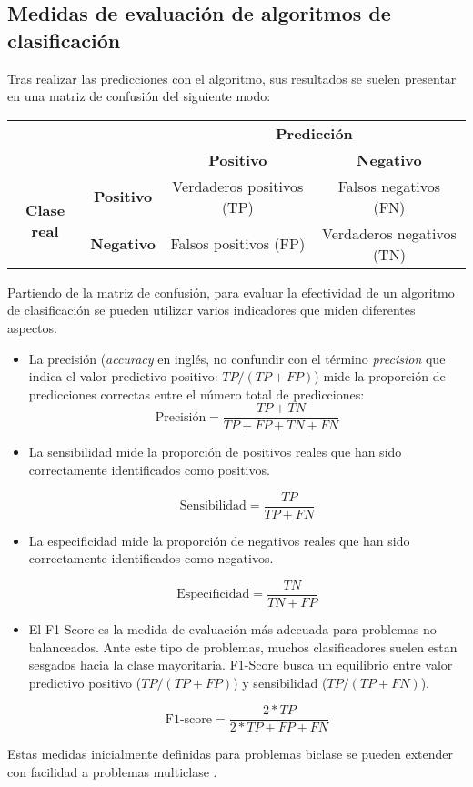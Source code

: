 \subsection{Medidas de evaluación de algoritmos de clasificación}

Tras realizar las predicciones con el algoritmo, sus resultados se suelen presentar en una matriz de confusión del siguiente modo:

\begin{table}[H]
	\centering	
	\begin{tabular}{cc|c|c|}
		\cline{3-4}
		&                   & \multicolumn{2}{c|}{\textbf{Predicción}}              \\ \cline{3-4} 
		&                   & \textbf{Positivo}         & \textbf{Negativo}         \\ \hline
		\multicolumn{1}{|c|}{\multirow{2}{*}{\textbf{Clase real}}} & \textbf{Positivo} & Verdaderos positivos (TP) & Falsos negativos (FN)     \\ \cline{2-4} 
		\multicolumn{1}{|c|}{}                                     & \textbf{Negativo} & Falsos positivos (FP)     & Verdaderos negativos (TN) \\ \hline
	\end{tabular}
\end{table}

Partiendo de la matriz de confusión, para evaluar la efectividad de un algoritmo de clasificación se pueden utilizar varios indicadores que miden diferentes aspectos. 

\begin{itemize}
	\item La precisión (\textit{accuracy} en inglés, no confundir con el término \textit{precision} que indica el valor predictivo positivo: $TP / (TP + FP)$) mide la proporción de predicciones correctas entre el número total de predicciones:
	$$\text{Precisión} = \dfrac{TP + TN}{TP + FP + TN + FN}$$ 
	
	
	\item La sensibilidad mide la proporción de positivos reales que han sido correctamente identificados como positivos.
	
		$$\text{Sensibilidad} = \dfrac{TP}{TP + FN}$$ 
		
	\item La especificidad mide la proporción de negativos reales que han sido correctamente identificados como negativos.
	
			$$\text{Especificidad} = \dfrac{TN}{TN + FP}$$ 
			
	\item El F1-Score es la medida de evaluación más adecuada para problemas no balanceados. Ante este tipo de problemas, muchos clasificadores suelen estan sesgados hacia la clase mayoritaria. F1-Score busca un equilibrio entre valor predictivo positivo ($TP/(TP + FP)$) y sensibilidad ($TP/(TP + FN)$).
	
				$$\text{F1-score} = \dfrac{2 * TP}{2 * TP + FP + FN}$$
\end{itemize}

Estas medidas inicialmente definidas para problemas biclase se pueden extender con facilidad a problemas multiclase \cite{Tharwat2018}.